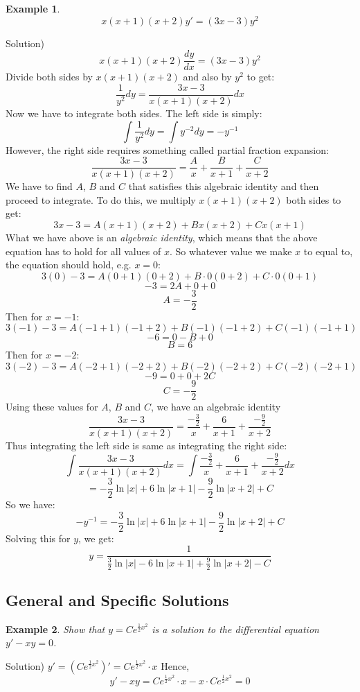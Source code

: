 \documentclass[12pt]{report}
\newtheorem{ex}{Example}[section]
\begin{document}
\begin{ex}
	$$x(x+1)(x+2) y' = (3x-3) y^2 $$
\end{ex}
Solution)
$$x(x+1)(x+2) \frac{dy}{dx} = (3x-3) y^2 $$
Divide both sides by $x(x+1)(x+2)$ and also by $y^2$ to get:
$$ \frac{1}{y^2 } dy = \frac{3x-3}{x(x+1)(x+2)} dx $$
Now we have to integrate both sides. The left side is simply:
$$\int \frac{1}{y^2 } dy = \int y^{-2} dy = - y^{-1}$$
However, the right side requires something called partial fraction expansion:
$$\frac{3x-3}{x(x+1)(x+2)} = \frac{A}{x}+ \frac{B}{x+1}+ \frac{C}{x+2}$$
We have to find $A$, $B$ and $C$ that satisfies this algebraic identity and then proceed to integrate. To do this, we multiply $x(x+1)(x+2)$ both sides to get:
$$3x-3 = A(x+1)(x+2)+ Bx(x+2)+ Cx(x+1)$$
What we have above is an \textit{algebraic identity}, which means that the above equation has to hold for all values of $x$. So whatever value we make $x$ to equal to, the equation should hold, e.g. $x=0$:
$$3(0)-3=A(0+1)(0+2)+ B\cdot 0(0+2)+ C\cdot 0(0+1)$$
$$-3 = 2A+0+0$$
$$A=-\frac{3}{2}$$
Then for $x=-1$:
$$3(-1)-3 = A(-1+1)(-1+2)+ B(-1)(-1+2)+ C(-1)(-1+1)$$
$$-6 = 0-B+0$$
$$B=6$$
Then for $x=-2$:
$$3(-2)-3 = A(-2+1)(-2+2)+ B(-2)(-2+2)+ C(-2)(-2+1)$$
$$-9 = 0+0+2C$$
$$C= -\frac{9}{2}$$
Using these values for $A$, $B$ and $C$, we have an algebraic identity
$$\frac{3x-3}{x(x+1)(x+2)} = \frac{-\frac{3}{2}}{x}+ \frac{6}{x+1}+ \frac{-\frac{9}{2}}{x+2}$$
Thus integrating the left side is same as integrating the right side:
$$\int \frac{3x-3}{x(x+1)(x+2)} dx = \int \frac{-\frac{3}{2}}{x}+ \frac{6}{x+1}+ \frac{-\frac{9}{2}}{x+2} dx $$
$$=  -\frac{3}{2} \ln{|x|} + 6 \ln{|x+1|}-\frac{9}{2}\ln{|x+2|}+C$$
So we have:
$$- y^{-1} = -\frac{3}{2} \ln{|x|} + 6 \ln{|x+1|} -\frac{9}{2}\ln{|x+2|} + C $$
Solving this for $y$, we get:
$$y = \frac{1}{\frac{3}{2} \ln{|x|} - 6 \ln{|x+1|} +\frac{9}{2}\ln{|x+2|}-C}$$

\subsection*{General and Specific Solutions }

\begin{ex} Show that $y= C e^{\frac{1}{2} x^2}$ is a solution to the differential equation $y'-xy=0$.
\end{ex}

Solution) $y'= \left( C e^{\frac{1}{2} x^2}\right)' =  C e^{\frac{1}{2} x^2}\cdot x $
Hence,
$$y'-xy= C e^{\frac{1}{2} x^2}\cdot x - x \cdot C e^{\frac{1}{2} x^2}= 0$$
\end{document}

